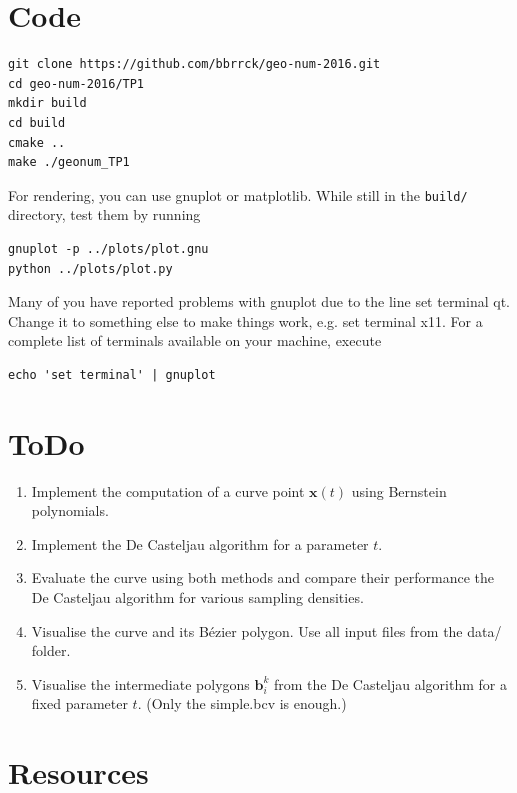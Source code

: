 \documentclass{article}
\begin{document}
\section{Code}\label{code}
\begin{lstlisting}
git clone https://github.com/bbrrck/geo-num-2016.git
cd geo-num-2016/TP1
mkdir build
cd build
cmake ..
make ./geonum_TP1
\end{lstlisting}
For rendering, you can use gnuplot or matplotlib.
While still in the \texttt{build/} directory, test them by running
\begin{lstlisting}
gnuplot -p ../plots/plot.gnu
python ../plots/plot.py
\end{lstlisting}
Many of you have reported problems with gnuplot due to the line set
terminal qt. Change it to something else to make things work, e.g. set
terminal x11. For a complete list of terminals available on your
machine, execute 
\begin{lstlisting}
echo 'set terminal' | gnuplot
\end{lstlisting}

\section{ToDo}\label{todo}

\begin{enumerate}
\def\labelenumi{\arabic{enumi}.}
\item
  Implement the computation of a curve point \(\mathbf x(t)\) using
  Bernstein polynomials.
\item
  Implement the De Casteljau algorithm for a parameter \(t\).
\item
  Evaluate the curve using both methods and compare their performance
  the De Casteljau algorithm for various sampling densities.
\item
  Visualise the curve and its Bézier polygon. Use all input files from
  the data/ folder.
\item
  Visualise the intermediate polygons \(\mathbf b_i^k\) from the De
  Casteljau algorithm for a fixed parameter \(t\). (Only the simple.bcv
  is enough.)
\end{enumerate}

\section{Resources}\label{resources}
\end{document}
